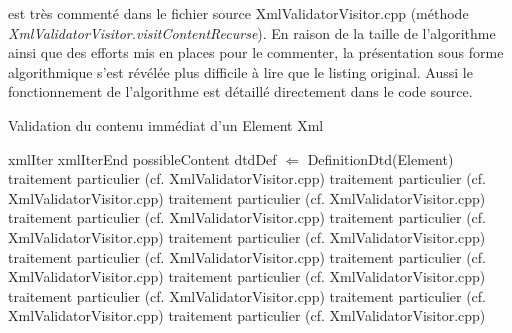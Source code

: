est très commenté dans le fichier source XmlValidatorVisitor.cpp (méthode \textit{XmlValidatorVisitor.visitContentRecurse}). En raison de la taille de l'algorithme ainsi que des efforts mis en places pour le commenter, la présentation sous forme algorithmique s'est révélée plus difficile à lire que le listing original. Aussi le fonctionnement de l'algorithme est détaillé directement dans le code source.
~\\
\begin{algorithm}
\caption{Validation du contenu immédiat d'un Element Xml}
\label{CheckContent}
\begin{algorithmic}
\REQUIRE xmlIter 
\REQUIRE xmlIterEnd 
\REQUIRE possibleContent 
\STATE dtdDef $\Leftarrow$ DefinitionDtd(Element)
    \STATE traitement particulier (cf. XmlValidatorVisitor.cpp)
    \STATE traitement particulier (cf. XmlValidatorVisitor.cpp)
    \STATE traitement particulier (cf. XmlValidatorVisitor.cpp)
    \STATE traitement particulier (cf. XmlValidatorVisitor.cpp)
  \ENDIF
{}
    \STATE traitement particulier (cf. XmlValidatorVisitor.cpp)
    \STATE traitement particulier (cf. XmlValidatorVisitor.cpp)
    \STATE traitement particulier (cf. XmlValidatorVisitor.cpp)
    \STATE traitement particulier (cf. XmlValidatorVisitor.cpp)
  \ENDIF
{}
    \STATE traitement particulier (cf. XmlValidatorVisitor.cpp)
    \STATE traitement particulier (cf. XmlValidatorVisitor.cpp)
    \STATE traitement particulier (cf. XmlValidatorVisitor.cpp)
    \STATE traitement particulier (cf. XmlValidatorVisitor.cpp)
  \ENDIF
\ENDIF 
\end{algorithmic}
\end{algorithm}
